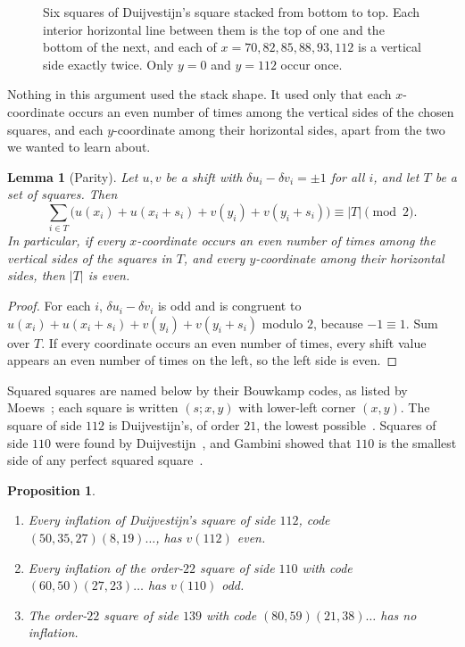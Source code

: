 \documentclass[11pt]{amsart}
\newtheorem{lem}[thm]{Lemma}
\newtheorem{prop}[thm]{Proposition}
\theoremstyle{definition}
\begin{document}
\begin{figure}[ht]
\centering

\caption{Six squares of Duijvestijn's square stacked from bottom to top. Each interior horizontal line
between them is the top of one and the bottom of the next, and each of $x=70,82,85,88,93,112$ is a
vertical side exactly twice. Only $y=0$ and $y=112$ occur once.}
\label{fig:parity}
\end{figure}

Nothing in this argument used the stack shape. It used only that each $x$-coordinate occurs an even
number of times among the vertical sides of the chosen squares, and each $y$-coordinate among their
horizontal sides, apart from the two we wanted to learn about.

\begin{lem}[Parity]\label{lem:parity}
Let $u,v$ be a shift with $\delta u_i-\delta v_i=\pm1$ for all $i$, and let $T$ be a set of squares. Then
\[
\sum_{i\in T}\bigl(u(x_i)+u(x_i+s_i)+v(y_i)+v(y_i+s_i)\bigr)\equiv|T|\pmod 2 .
\]
In particular, if every $x$-coordinate occurs an even number of times among the vertical sides of the
squares in $T$, and every $y$-coordinate among their horizontal sides, then $|T|$ is even.
\end{lem}

\begin{proof}
For each $i$, $\delta u_i-\delta v_i$ is odd and is congruent to $u(x_i)+u(x_i+s_i)+v(y_i)+v(y_i+s_i)$
modulo $2$, because $-1\equiv1$. Sum over $T$. If every coordinate occurs an even number of times,
every shift value appears an even number of times on the left, so the left side is even.
\end{proof}

Squared squares are named below by their Bouwkamp codes, as listed by Moews~\cite{moews}; each square
is written $(s;x,y)$ with lower-left corner $(x,y)$. The square of side $112$ is Duijvestijn's, of
order $21$, the lowest possible~\cite{duij78}. Squares of side $110$ were found by
Duijvestijn~\cite{duij93}, and Gambini showed that $110$ is the smallest side of any perfect
squared square~\cite{gambini}.

\begin{prop}\label{prop:three}\leavevmode
\begin{enumerate}
\item Every inflation of Duijvestijn's square of side $112$, code $(50,35,27)(8,19)\dots$, has
$v(112)$ even.
\item Every inflation of the order-$22$ square of side $110$ with code $(60,50)(27,23)\dots$ has
$v(110)$ odd.
\item The order-$22$ square of side $139$ with code $(80,59)(21,38)\dots$ has no inflation.
\end{enumerate}
\end{prop}
\end{document}
